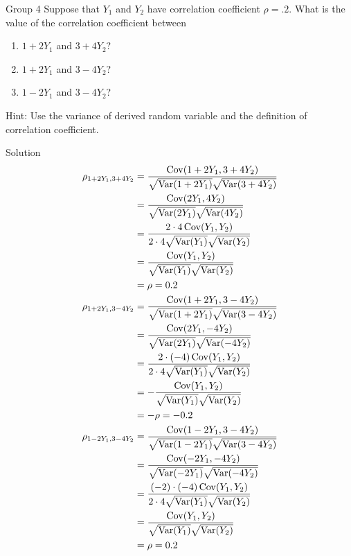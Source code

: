 \documentclass{article}
\begin{document}
\begin{problem}
    {Group 4}
    Suppose that $Y_1$ and $Y_2$ have correlation coefficient $\rho = .2$. What is the value of the correlation coefficient between
    \begin{enumerate}
        \item $1 + 2Y_1$ and $3 + 4Y_2$?
        \item $1 + 2Y_1$ and $3 - 4Y_2$?
        \item $1 - 2Y_1$ and $3 - 4Y_2$?
    \end{enumerate}
    \begin{solution}
        {Hint:}
        Use the variance of derived random variable and the definition of correlation coefficient.
    \end{solution}
\end{problem}

\begin{solution}
    {Solution}
    \begin{align*}
        \rho_{1+2Y_1,3+4Y_2} &= \frac{\Cov(1+2Y_1,3+4Y_2)}{\sqrt{\Var(1+2Y_1)}\sqrt{\Var(3+4Y_2)}} \\
        &= \frac{\Cov(2Y_1,4Y_2)}{\sqrt{\Var(2Y_1)}\sqrt{\Var(4Y_2)}} \\
        &= \frac{2\cdot 4\Cov(Y_1,Y_2)}{2\cdot 4\sqrt{\Var(Y_1)}\sqrt{\Var(Y_2)}} \\
        &= \frac{\Cov(Y_1,Y_2)}{\sqrt{\Var(Y_1)}\sqrt{\Var(Y_2)}} \\
        &= \rho = 0.2 \\
        \rho_{1+2Y_1,3-4Y_2} &= \frac{\Cov(1+2Y_1,3-4Y_2)}{\sqrt{\Var(1+2Y_1)}\sqrt{\Var(3-4Y_2)}} \\
        &= \frac{\Cov(2Y_1,-4Y_2)}{\sqrt{\Var(2Y_1)}\sqrt{\Var(-4Y_2)}} \\
        &= \frac{2\cdot (-4)\Cov(Y_1,Y_2)}{2\cdot 4\sqrt{\Var(Y_1)}\sqrt{\Var(Y_2)}} \\
        &= -\frac{\Cov(Y_1,Y_2)}{\sqrt{\Var(Y_1)}\sqrt{\Var(Y_2)}} \\
        &= -\rho = -0.2 \\
        \rho_{1-2Y_1,3-4Y_2} &= \frac{\Cov(1-2Y_1,3-4Y_2)}{\sqrt{\Var(1-2Y_1)}\sqrt{\Var(3-4Y_2)}} \\
        &= \frac{\Cov(-2Y_1,-4Y_2)}{\sqrt{\Var(-2Y_1)}\sqrt{\Var(-4Y_2)}} \\
        &= \frac{(-2)\cdot (-4)\Cov(Y_1,Y_2)}{2\cdot 4\sqrt{\Var(Y_1)}\sqrt{\Var(Y_2)}} \\
        &= \frac{\Cov(Y_1,Y_2)}{\sqrt{\Var(Y_1)}\sqrt{\Var(Y_2)}} \\
        &= \rho = 0.2
    \end{align*}
\end{solution}
\end{document}
